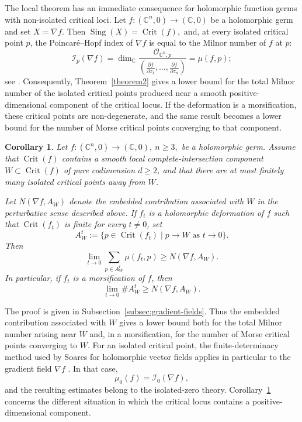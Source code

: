 \documentclass[10pt,twoside]{amsart}
\numberwithin{equation}{section}
\newtheorem{corollary}[proposition]{Corollary}
\theoremstyle{definition}
\theoremstyle{remark}
\DeclareMathOperator{\sing}{Sing}
\begin{document}
The local theorem has an immediate consequence for holomorphic function germs with non-isolated critical loci. Let
$
f:(\mathbb C^n,0)\longrightarrow(\mathbb C,0)
$
be a holomorphic germ and set $X=\nabla f$. Then
$
\sing(X)=\operatorname{Crit}(f),
$
and, at every isolated critical point $p$, the Poincar\'e--Hopf index of $\nabla f$ is equal to the Milnor number of $f$ at $p$:
\[
\mathcal I_p(\nabla f)
=
\dim_{\mathbb C}
\frac{\mathcal O_{\mathbb C^n,p}}
{\left(
\frac{\partial f}{\partial z_1},\ldots,
\frac{\partial f}{\partial z_n}
\right)}
=
\mu(f,p);
\]
see \cite{Milnor}. Consequently, Theorem~\ref{theorem2} gives a lower bound for the total Milnor number of the isolated critical points produced near a smooth positive-dimensional component of the critical locus. If the deformation is a morsification, these critical points are non-degenerate, and the same result becomes a lower bound for the number of Morse critical points converging to that component.

\begin{corollary}\label{coro:gradient-introduction}
Let
$
f:(\mathbb C^n,0)\longrightarrow(\mathbb C,0),
\  n\geq3,
$
be a holomorphic germ. Assume that $\operatorname{Crit}(f)$ contains a smooth local complete-intersection component
$
W\subset\operatorname{Crit}(f)
$
of pure codimension $d\geq2$, and that there are at most finitely many isolated critical points away from $W$.

Let $N(\nabla f,A_W)$ denote the embedded contribution associated with $W$ in the perturbative sense described above. If $f_t$ is a holomorphic deformation of $f$ such that $\operatorname{Crit}(f_t)$ is finite for every $t\neq0$, set
\[
A_W^t:=\bigl\{p\in\operatorname{Crit}(f_t)\mid p\to W\text{ as }t\to0\bigr\}.
\]
Then
\[
\lim_{t\to0}\sum_{p\in A_W^t}\mu(f_t,p)
\geq
N(\nabla f,A_W).
\]
In particular, if $f_t$ is a morsification of $f$, then
\[
\lim_{t\to0}\#A_W^t
\geq
N(\nabla f,A_W).
\]
\end{corollary}

The proof is given in Subsection~\ref{subsec:gradient-fields}. Thus the embedded contribution associated with $W$ gives a lower bound both for the total Milnor number arising near $W$ and, in a morsification, for the number of Morse critical points converging to $W$.
For an isolated critical point, the finite-determinacy method used by Soares for holomorphic vector fields applies in particular to the gradient field $\nabla f$ \cite{MGS}. In that case,
\[
\mu_0(f)=\mathcal I_0(\nabla f),
\]
and the resulting estimates belong to the isolated-zero theory. Corollary~\ref{coro:gradient-introduction} concerns the different situation in which the critical locus contains a positive-dimensional component.
\end{document}
